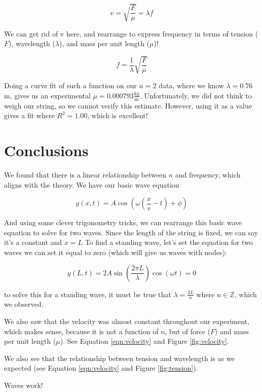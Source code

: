 \documentclass[12pt,letterpaper]{article}
\begin{document}
\begin{equation}
\label{eqn:velocity}
    v= \sqrt{\frac{F}{\mu}}=\lambda f 
\end{equation}

We can get rid of v here, and rearrange to express frequency in terms of tension ($F$), wavelength ($\lambda$), and mass per unit length ($\mu$)!

\begin{equation*}
    f= \frac{1}{\lambda}\sqrt{\frac{F}{\mu}}
\end{equation*}

Doing a curve fit of such a function on our $n=2$ data, where we know $\lambda = 0.76 $ m, gives us an experimental $\mu = 0.000793 \frac{\text{kg}}{\text{m}}$. Unfortunately, we did not think to weigh our string, so we cannot verify this estimate. However, using it as a value gives a fit where $R^2 = 1.00$, which is excellent!


\section{Conclusions}

We found that there is a linear relationship between $n$ and frequency, which aligns with the theory. We have our basic wave equation

\begin{equation}
\label{eqn:wave}
    y(x,t)=A\cos\left(\omega\left(\frac{x}{v}-t\right)+\phi\right)
\end{equation}

And using some clever trigonometry tricks, we can rearrange this basic wave equation to solve for two waves. Since the length of the string is fixed, we can say it's a constant and $x=L$ To find a standing wave, let's set the equation for two waves we can set it equal to zero (which will give us waves with nodes):

\begin{equation}
\label{eqn:standing}
    y(L,t)=2A\sin\left(\frac{2\pi L}{\lambda}\right)\cos(\omega t)=0
\end{equation}

to solve this for a standing wave, it must be true that $\lambda=\frac{2L}{n}$ where $n \in \mathds{Z}$, which we observed. 

We also saw that the velocity was almost constant throughout our experiment, which makes sense, because it is not a function of $n$, but of force ($F$) and mass per unit length ($\mu$). See Equation \ref{eqn:velocity} and Figure \ref{fig:velocity}.

We also see that the relationship between tension and wavelength is as we expected (see Equation \ref{eqn:velocity} and Figure \ref{fig:tension}).

Waves work!


% 
% 
\end{document}
